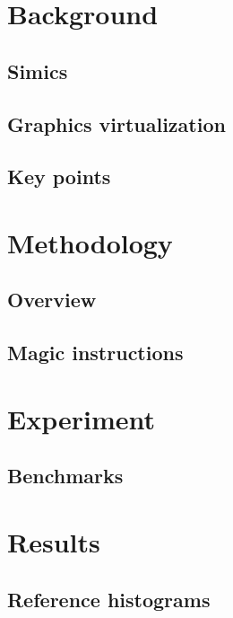 \documentclass{beamer}
\begin{document}
	

	\section{Background}
	\subsection{Simics}
	
	\subsection{Graphics virtualization}
	

	\subsection{Key points}
	

	\section{Methodology}
	\subsection{Overview}
	
	\subsection{Magic instructions}

	\section{Experiment}
	\subsection{Benchmarks}
	

	\section{Results}
	\subsection{Reference histograms}
	
\end{document}
